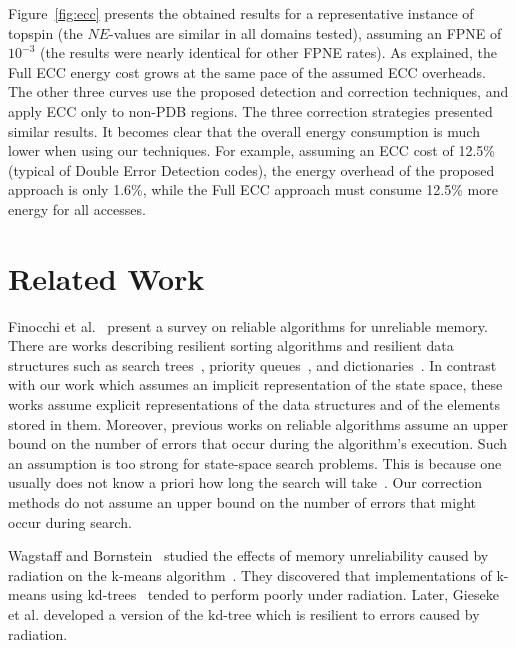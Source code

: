 \documentclass[letterpaper]{article}
\begin{document}
Figure~\ref{fig:ecc} presents the obtained results for a representative instance of topspin (the $NE$-values are similar in all domains tested), assuming an FPNE of $10^{-3}$ (the results were nearly identical for other FPNE rates). As explained, the Full ECC energy cost grows at the same pace of the assumed ECC overheads. The other three curves use the proposed detection and correction techniques, and apply ECC only to non-PDB regions. The three correction strategies presented similar results.  It becomes clear that the overall energy consumption is much lower when using our techniques. For example, assuming an ECC cost of 12.5\% (typical of Double Error Detection codes), the energy overhead of the proposed approach is only 1.6\%, while the Full ECC approach must consume 12.5\% more energy for all accesses.



\section{Related Work}

Finocchi et al.~ present a survey on reliable algorithms for unreliable memory. There are works describing resilient sorting algorithms and resilient data structures such as search trees~\cite{finocchi2007resilient}, priority queues~\cite{jorgensen2007priority}, and dictionaries~\cite{brodal2007optimal}. In contrast with our work which assumes an implicit representation of the state space, these works assume explicit representations of the data structures and of the elements stored in them. Moreover, previous works on reliable algorithms assume an upper bound on the number of errors that occur during the algorithm's execution. Such an assumption is too strong for state-space search problems. This is because one usually does not know a priori how long the search will take~\cite{Knuth75}. Our correction methods do not assume an upper bound on the number of errors that might occur during search.

Wagstaff and Bornstein~ studied the effects of memory unreliability caused by radiation on the k-means algorithm~\cite{mcqueen67}. %
They discovered that implementations of k-means using kd-trees~\cite{Kanetal2002} tended to perform poorly under radiation. Later, Gieseke et al.  developed a version of the kd-tree which is resilient to errors caused by radiation.
\end{document}
